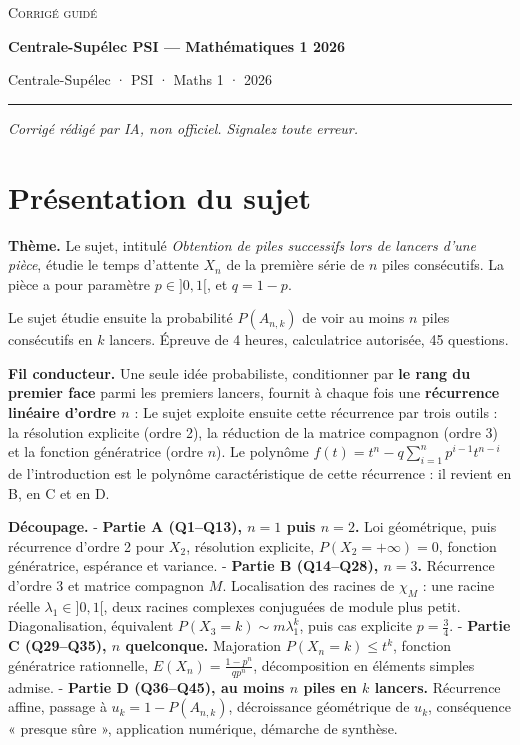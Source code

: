 \documentclass[11pt,a4paper]{article}
\newcommand{\equationajustee}[1]{%
  \sbox{\boiteequation}{$\displaystyle #1$}%
  \ifdim\wd\boiteequation>\linewidth
    \[\resizebox{\linewidth}{!}{\usebox{\boiteequation}}\]%
  \else
    \[#1\]%
  \fi}
\begin{document}
\thispagestyle{plain}
\begin{center}
  {\small\scshape Corrigé guidé}\par\smallskip
  {\LARGE\bfseries Centrale-Supélec PSI — Mathématiques 1 2026\par}\medskip
  {\large Centrale-Supélec · PSI · Maths 1 · 2026\par}
\end{center}
\vspace{2pt}\hrule\vspace{8pt}

\emph{Corrigé rédigé par IA, non officiel. Signalez toute erreur.}

\hypertarget{pruxe9sentation-du-sujet}{%
\section{Présentation du sujet}\label{pruxe9sentation-du-sujet}}

\textbf{Thème.} Le sujet, intitulé \emph{Obtention de piles successifs lors de lancers d'une pièce}, étudie le temps d'attente \(X_n\) de la première série de \(n\) piles consécutifs. La pièce a pour paramètre \(p\in]0,1[\), et \(q=1-p\).

Le sujet étudie ensuite la probabilité \(P(A_{n,k})\) de voir au moins \(n\) piles consécutifs en \(k\) lancers. Épreuve de 4 heures, calculatrice autorisée, 45 questions.

\textbf{Fil conducteur.} Une seule idée probabiliste, conditionner par \textbf{le rang du premier face} parmi les premiers lancers, fournit à chaque fois une \textbf{récurrence linéaire d'ordre \(n\)} :
\equationajustee{\begin{aligned}
P(X_n=k)&=\sum_{i=1}^nqp^{i-1}P(X_n=k-i)\\
&=qP(X_n=k-1)+\dots+qp^{n-1}P(X_n=k-n).
\end{aligned}}
Le sujet exploite ensuite cette récurrence par trois outils : la résolution explicite (ordre 2), la réduction de la matrice compagnon (ordre 3) et la fonction génératrice (ordre \(n\)). Le polynôme \(f(t)=t^n-q\sum_{i=1}^np^{i-1}t^{n-i}\) de l'introduction est le polynôme caractéristique de cette récurrence : il revient en B, en C et en D.

\textbf{Découpage.}
- \textbf{Partie A (Q1--Q13), \(n=1\) puis \(n=2\).} Loi géométrique, puis récurrence d'ordre 2 pour \(X_2\), résolution explicite, \(P(X_2=+\infty)=0\), fonction génératrice, espérance et variance.
- \textbf{Partie B (Q14--Q28), \(n=3\).} Récurrence d'ordre 3 et matrice compagnon \(M\). Localisation des racines de \(\chi_M\) : une racine réelle \(\lambda_1\in]0,1[\), deux racines complexes conjuguées de module plus petit. Diagonalisation, équivalent \(P(X_3=k)\sim m\lambda_1^k\), puis cas explicite \(p=\frac34\).
- \textbf{Partie C (Q29--Q35), \(n\) quelconque.} Majoration \(P(X_n=k)\leqslant t^k\), fonction génératrice rationnelle, \(E(X_n)=\frac{1-p^n}{qp^n}\), décomposition en éléments simples admise.
- \textbf{Partie D (Q36--Q45), au moins \(n\) piles en \(k\) lancers.} Récurrence affine, passage à \(u_k=1-P(A_{n,k})\), décroissance géométrique de \(u_k\), conséquence « presque sûre », application numérique, démarche de synthèse.
\end{document}
